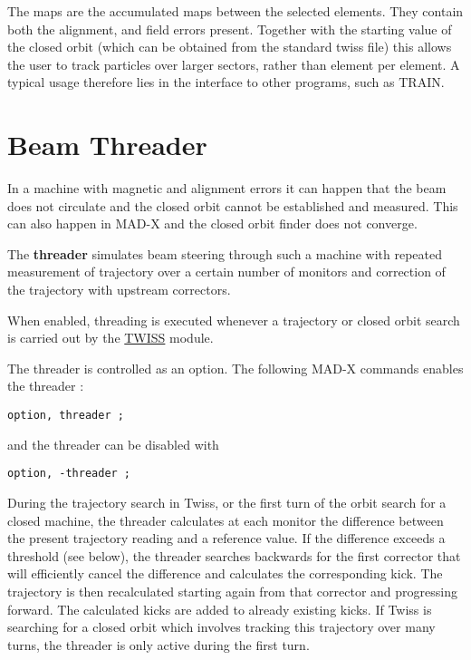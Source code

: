 The maps are the accumulated maps between the selected elements. They
contain both the alignment, and field errors present. Together with the
starting value of the closed orbit (which can be obtained from the
standard twiss file) this allows the user to track particles over larger
sectors, rather than element per element. A typical usage therefore lies
in the interface to other programs, such as TRAIN.  


%

\section{Beam Threader} 

In a machine with magnetic and alignment errors it can happen that the
beam does not circulate and the closed orbit cannot be established and
measured. This can also happen in MAD-X and the closed orbit finder does
not converge. 

The \textbf{threader} simulates beam steering through such a machine
with repeated measurement of trajectory over a certain number of
monitors and correction of the trajectory with upstream correctors.   

When enabled, threading is executed whenever a trajectory or closed
orbit search is carried out by the \href{../twiss/twiss.html}{TWISS}
module.   

The threader is controlled as an option. 
The following MAD-X commands enables the threader :
\begin{verbatim}
option, threader ;
\end{verbatim}  
and the threader can be disabled with
\begin{verbatim}
option, -threader ;
\end{verbatim}  

During the trajectory search in Twiss, or the first turn of the orbit
search for a closed machine, the threader calculates at each monitor the
difference between the present trajectory reading and a reference value.  
If the difference exceeds a threshold (see below), the threader searches
backwards for the first corrector that will efficiently cancel the
difference and calculates the corresponding kick. The trajectory is then
recalculated starting again from that corrector and progressing
forward. The calculated kicks are added to already existing kicks. If
Twiss is searching for a closed orbit which involves tracking this
trajectory over many turns, the threader is only active during the first
turn.  

